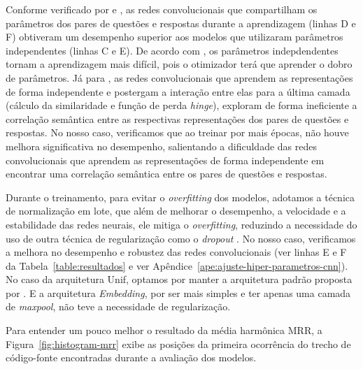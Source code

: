 Conforme verificado por \cite{tan-lstm-qa} e \cite{feng-2015}, as redes convolucionais que compartilham os parâmetros dos pares de questões e respostas durante a aprendizagem (linhas D e F) obtiveram um desempenho superior aos modelos que utilizaram parâmetros independentes (linhas C e E). De acordo com \cite{tan-lstm-qa}, os parâmetros indepdendentes tornam a aprendizagem mais difícil, pois o otimizador terá que aprender o dobro de parâmetros. Já para \cite{wen-joint-modeling-question-answer-2019}, as redes convolucionais que aprendem as representações de forma independente e postergam a interação entre elas para a última camada (cálculo da similaridade e função de perda \textit{hinge}), exploram de forma ineficiente a correlação semântica entre as respectivas representações dos pares de questões e respostas. No nosso caso, verificamos que ao treinar por mais épocas, não houve melhora significativa no desempenho, salientando a dificuldade das redes convolucionais que aprendem as representações de forma independente em encontrar uma correlação semântica entre os pares de questões e respostas.

Durante o treinamento, para evitar o \textit{overfitting} dos modelos, adotamos a técnica de normalização em lote, que além de melhorar o desempenho, a velocidade e a estabilidade das redes neurais, ele mitiga o \textit{overfitting}, reduzindo a necessidade do uso de outra técnica de regularização como o \textit{dropout} \citep{sergey-batch-normalization-2015}. No nosso caso, verificamos a melhora no desempenho e robustez das redes convolucionais (ver linhas E e F da Tabela~\ref{table:resultados} e ver Apêndice~\ref{ape:ajuste-hiper-parametros-cnn}). No caso da arquitetura Unif, optamos por manter a arquitetura padrão proposta por \cite{cambronero-deep-learning-code-search:2019}. E a arquitetura \textit{Embedding}, por ser mais simples e ter apenas uma camada de \textit{maxpool}, não teve a necessidade de regularização.


Para entender um pouco melhor o resultado da média harmônica MRR, a Figura~\ref{fig:histogram-mrr} exibe as posições da primeira ocorrência do trecho de código-fonte encontradas durante a avaliação dos modelos.

